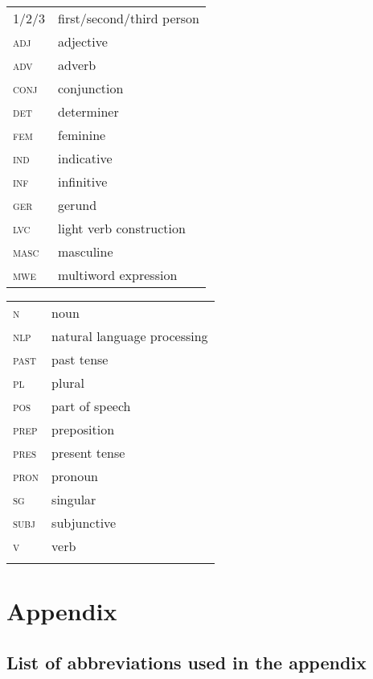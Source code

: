 \documentclass[output=paper]{langsci/langscibook}
\begin{document}
\begin{tabularx}{.45\textwidth}{lQ}
\textsc{1/2/3} & first/second/third person \\
\textsc{adj} & adjective \\
\textsc{adv} & adverb \\
\textsc{conj} & conjunction \\
\textsc{det} & determiner \\
\textsc{fem} & feminine \\
\textsc{ind} & indicative \\
\textsc{inf} & infinitive \\
\textsc{ger} & gerund \\
\textsc{lvc} & light verb construction\\
\textsc{masc} & masculine \\
\textsc{mwe}  & multiword expression\\
\end{tabularx}
\begin{tabularx}{.45\textwidth}{ll}
\textsc{n} & noun \\
\textsc{nlp} & natural language processing\\
\textsc{past} & past tense \\
\textsc{pl} & plural \\
\textsc{pos} & part of speech\\
\textsc{prep} & preposition \\
\textsc{pres} & present tense \\
\textsc{pron} & pronoun \\
\textsc{sg} & singular \\
\textsc{subj} & subjunctive\\
\textsc{v} & verb\\ 
\\
\end{tabularx} 


\newpage

\section*{Appendix}
\renewcommand{\thesubsection}{Appendix \Alph{subsection}}

\subsection*{List of abbreviations used in the appendix}
\label{sec:app-abbreviations}
\end{document}
